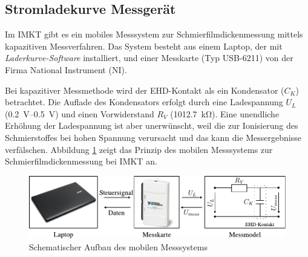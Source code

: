 \subsection{Stromladekurve Messgerät}
\label{sub:stromladekurve_messgeraet}

Im IMKT gibt es ein mobiles Messsystem zur Schmierfilmdickenmessung mittels kapazitiven Messverfahren.
Das System besteht aus einem Laptop, der mit \textit{Laderkurve-Software} installiert, und einer Messkarte (Typ USB-6211) von der Firma National Instrument (NI).

Bei kapazitiver Messmethode wird der EHD-Kontakt als ein Kondensator ($C_K$) betrachtet.
Die Auflade des Kondensators erfolgt durch eine Ladespannung $U_L$ (\SIrange{0,2}{0,5}{\volt}) und einen Vorwiderstand $R_V$ (\SI{1012.7}{\kilo\ohm}).
Eine unendliche Erhöhung der Ladespannung ist aber unerwünscht, weil die zur Ionisierung des Schmierstoffes bei hohen Spannung verursacht und das kann die Messergebnisse verfälschen.
Abbildung \ref{fig:Schematischer_aufbau_des_mobilen_messsystems} zeigt das Prinzip des mobilen Messsystems zur Schmierfilmdickenmessung bei IMKT an.
\begin{figure}[htb]
    \centering
    \includegraphics[]{./images/schematischer_aufbau_des_mobilen_messsystem.pdf}
    \caption{Schematischer Aufbau des mobilen Messsystems}
    \label{fig:Schematischer_aufbau_des_mobilen_messsystems}
\end{figure}

